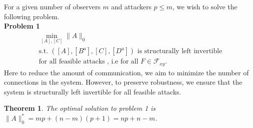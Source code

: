 \documentclass[letterpaper, 10 pt, conference]{ieeeconf}
\newtheorem{theorem}{Theorem}
\begin{document}
For a given number of observers $m$ and attackers $p \le m$, we wish to solve the following problem. \\
\textbf{Problem 1}
\begin{align*}
 & \underset{[A],[C]}{\min}  \| A \|_0 \\
 & \mbox{s.t. } ([A],[B^a],[C],[D^a]) \mbox{ is structurally left invertible} \\ 
 &\mbox{for all feasible attacks , i.e for all }F \in  \mathcal{F}_{xy}.
\end{align*}
Here to reduce the amount of communication, we aim to minimize the number of connections in the system. However, to preserve robustness, we ensure that the system is structurally left invertible for all feasible attacks.
\begin{theorem}
The optimal solution to problem 1 is $\|A\|_0^* =  mp + (n-m)(p+1)  = np + n - m$. \label{optimization}
\end{theorem}
\end{document}

